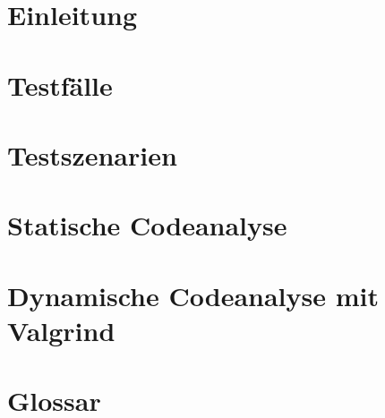 

	
	\maketitle
	\setcounter{tocdepth}{1}
	\tableofcontents
	\chapter{Einleitung}
		
	\chapter{Testfälle}
		
	\chapter{Testszenarien}
		
	\chapter{Statische Codeanalyse}
		
	\chapter{Dynamische Codeanalyse mit Valgrind}
		
	\chapter{Glossar}
		
